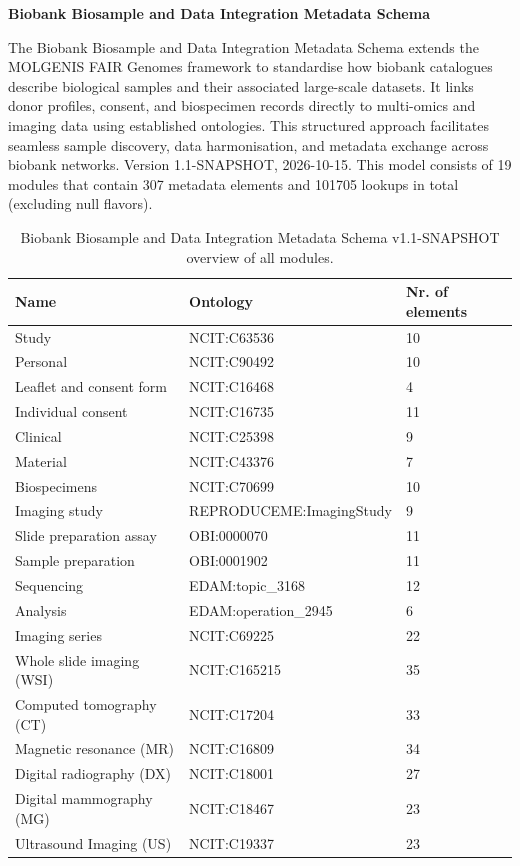 \documentclass{article}
\begin{document}
\setlength\parindent{0pt}

\textbf{Biobank Biosample and Data Integration Metadata Schema}
\newline

The Biobank Biosample and Data Integration Metadata Schema extends the MOLGENIS FAIR Genomes framework to standardise how biobank catalogues describe biological samples and their associated large-scale datasets. It links donor profiles, consent, and biospecimen records directly to multi-omics and imaging data using established ontologies. This structured approach facilitates seamless sample discovery, data harmonisation, and metadata exchange across biobank networks. Version 1.1-SNAPSHOT, 2026-10-15. This model consists of 19 modules that contain 307 metadata elements and 101705 lookups in total (excluding null flavors).

\begin{table}[htb]
\begin{tabular}{lll}
Name & Ontology & Nr. of elements \\
\hline
Study & NCIT:C63536 & 10 \\
Personal & NCIT:C90492 & 10 \\
Leaflet and consent form & NCIT:C16468 & 4 \\
Individual consent & NCIT:C16735 & 11 \\
Clinical & NCIT:C25398 & 9 \\
Material & NCIT:C43376 & 7 \\
Biospecimens & NCIT:C70699 & 10 \\
Imaging study & REPRODUCEME:ImagingStudy & 9 \\
Slide preparation assay & OBI:0000070 & 11 \\
Sample preparation & OBI:0001902 & 11 \\
Sequencing & EDAM:topic\_3168 & 12 \\
Analysis & EDAM:operation\_2945 & 6 \\
Imaging series & NCIT:C69225 & 22 \\
Whole slide imaging (WSI) & NCIT:C165215 & 35 \\
Computed tomography (CT) & NCIT:C17204 & 33 \\
Magnetic resonance (MR) & NCIT:C16809 & 34 \\
Digital radiography (DX) & NCIT:C18001 & 27 \\
Digital mammography (MG) & NCIT:C18467 & 23 \\
Ultrasound Imaging (US) & NCIT:C19337 & 23 \\
\hline
\end{tabular}
\caption[Module overview]{\label{table:table1} Biobank Biosample and Data Integration Metadata Schema v1.1-SNAPSHOT overview of all modules.}
\end{table}
\end{document}
